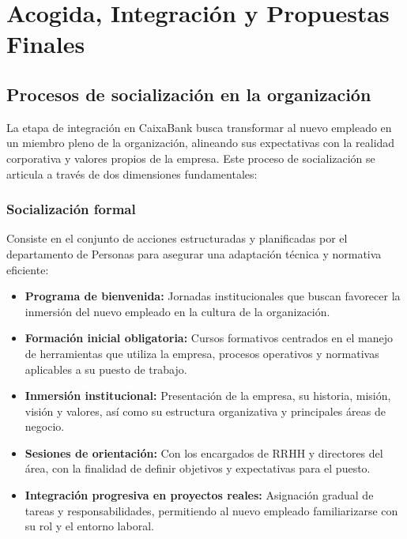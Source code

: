 
\section{Acogida, Integración y Propuestas Finales}
\subsection{Procesos de socialización en la organización}
La etapa de integración en CaixaBank busca transformar al nuevo empleado en un miembro pleno de la organización, alineando sus expectativas con la realidad corporativa y valores propios de la empresa. 
Este proceso de socialización se articula a través de dos dimensiones fundamentales:

\subsubsection{Socialización formal}

Consiste en el conjunto de acciones estructuradas y planificadas por el departamento de Personas para asegurar una adaptación técnica y normativa eficiente:
\begin{itemize}
    \item \textbf{Programa de bienvenida:} Jornadas institucionales que buscan favorecer la inmersión del nuevo empleado en la cultura de la organización.
    \item \textbf{Formación inicial obligatoria:} Cursos formativos centrados en el manejo de herramientas que utiliza la empresa, procesos operativos y normativas aplicables a su puesto de trabajo.
    \item \textbf{Inmersión institucional:} Presentación de la empresa, su historia, misión, visión y valores, así como su estructura organizativa y principales áreas de negocio.
    \item \textbf{Sesiones de orientación:} Con los encargados de RRHH y directores del área, con la finalidad de definir objetivos y expectativas para el puesto.
    \item \textbf{Integración progresiva en proyectos reales:} Asignación gradual de tareas y responsabilidades, permitiendo al nuevo empleado familiarizarse con su rol y el entorno laboral.  
\end{itemize}

